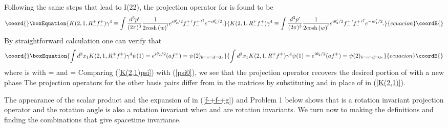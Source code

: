 \documentclass[a4paper,12pt]{article}
\begin{document}
 	Following the same steps that lead to I(22), the projection operator \coordHE{} for \coordHE{} is found to be  
\begin{equation}\coord{}\boxEquation{	\label{K(2,1)}
 K(2,1,R_{-}^{+} f_{-}^{+}) \gamma^{4} \equiv \int \frac{d^3 p^{\prime} }{(2 \pi)^3} \frac{1}{2 {\cosh{(w)}}^{\prime}}e^{i \theta_{2}^{\prime}/2}  f_{-}^{+ \, \prime} {f_{-}^{+ \, \prime }}^{\dagger} e^{ -i \theta_{1}^{\prime}/2} .
}{	K(2,1,R_{-}^{+} f_{-}^{+}) \gamma^{4} \equiv \int \frac{d^3 p^{\prime} }{(2 \pi)^3} \frac{1}{2 {\cosh{(w)}}^{\prime}}e^{i \theta_{2}^{\prime}/2}  f_{-}^{+ \, \prime} {f_{-}^{+ \, \prime }}^{\dagger} e^{ -i \theta_{1}^{\prime}/2} .
}{ecuacion}\coordE{}\end{equation} 
By straightforward calculation one can verify that
\begin{equation}\coord{}\boxEquation{	\label{K(2,1)psi}
 \int d^{3} x_{1} K(2,1,R_{-}^{+} f_{-}^{+}) \gamma^{4} \psi(1) =  e^{i \theta_{2} / 2} (a f_{-}^{+}) = \psi(2)_{b=c=d=0} ,
}{	\int d^{3} x_{1} K(2,1,R_{-}^{+} f_{-}^{+}) \gamma^{4} \psi(1) =  e^{i \theta_{2} / 2} (a f_{-}^{+}) = \psi(2)_{b=c=d=0} ,
}{ecuacion}\coordE{}\end{equation} 
where \coordHE{} is \myHighlight{$\psi$}\coordHE{} with \myHighlight{$\theta$}\coordHE{} = \coordHE{} and \coordHE{} = \coordHE{}
Comparing (\ref{K(2,1)psi}) with (\ref{psi0}), we see that the projection operator recovers the desired portion of \myHighlight{$\psi$}\coordHE{} with a new phase \coordHE{} The projection operators for the other basis pairs differ from \coordHE{} in the matrices by substituting \coordHE{}  \coordHE{} and \coordHE{} in place of \coordHE{} in (\ref{K(2,1)}).

	The appearance of the scalar product \coordHE{} and the expansion of \coordHE{} in (\ref{f-+f-+g}) and Problem 1 below shows that \coordHE{} is a rotation invariant projection operator and the rotation angle \myHighlight{$\theta$}\coordHE{} is also a rotation invariant when \myHighlight{$\Delta$}\coordHE{} and \coordHE{} are rotation invariants. We turn now to making the definitions and finding the combinations that give spacetime invariance.
\end{document}

